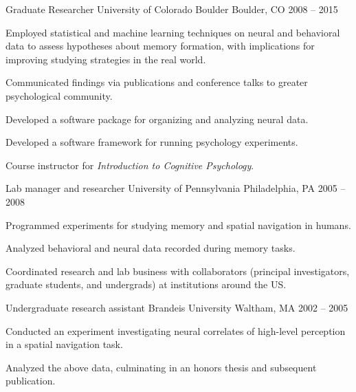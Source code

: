 \begin{cventries}
  \cventry
    {Graduate Researcher} %
    {University of Colorado Boulder} %
    {Boulder, CO} %
    {2008 -- 2015} %
    {
      \begin{cvitems} %
        \item {Employed statistical and machine learning techniques on neural and behavioral data to assess hypotheses about memory formation, with implications for improving studying strategies in the real world.}
        \item {Communicated findings via publications and conference talks to greater psychological community.}
        \item {Developed a software package for organizing and analyzing neural data.}
        \item {Developed a software framework for running psychology experiments.}
        \item {Course instructor for \textit{Introduction to Cognitive Psychology}.}
      \end{cvitems}
    }

  \cventry
    {Lab manager and researcher} %
    {University of Pennsylvania} %
    {Philadelphia, PA} %
    {2005 -- 2008} %
    {
      \begin{cvitems} %
        \item {Programmed experiments for studying memory and spatial navigation in humans.}
        \item {Analyzed behavioral and neural data recorded during memory tasks.}
        \item {Coordinated research and lab business with collaborators (principal investigators, graduate students, and undergrads) at institutions around the US.}
      \end{cvitems}
    }

  \cventry
    {Undergraduate research assistant} %
    {Brandeis University} %
    {Waltham, MA} %
    {2002 -- 2005} %
    {
      \begin{cvitems} %
        \item {Conducted an experiment investigating neural correlates of high-level perception in a spatial navigation task.}
        \item {Analyzed the above data, culminating in an honors thesis and subsequent publication.}
      \end{cvitems}
    }

\end{cventries}
